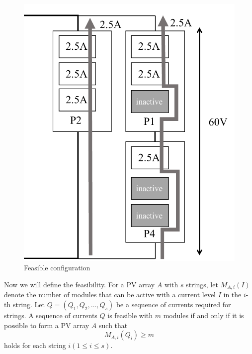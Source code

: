 \documentclass[conference]{IEEEtran}
\begin{document}
\begin{figure}[t]
    \centering
    \includegraphics[width=0.5\linewidth]{fig/feasible-configuration.pdf}
    \caption{Feasible configuration}
    \label{fig:feasible-configuration}
\end{figure}

Now we will define the feasibility. For a PV array $A$ with $s$ strings, let $M_{A,i}(I)$ denote the number of modules that can be active with a current level $I$ in the $i$-th string.
Let $Q = (Q_{1},Q_{2},\ldots ,Q_{s})$ be a sequence of currents required for strings. 
A sequence of currents $Q$ is feasible with $m$ modules if and only if it is possible to form a PV array $A$ such that 
\begin{equation}
M_{A,i}(Q_{i}) \geq m
\end{equation}
holds for each string $i (1 \leq i \leq s)$.


%
\end{document}
